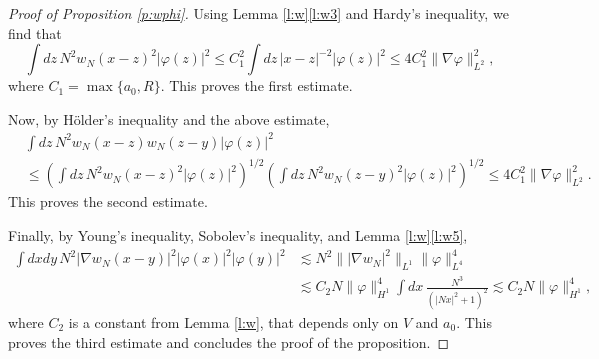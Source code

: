 \documentclass[11pt,a4paper,DIV11]{scrartcl}	%
\newcommand{\bd}{\begin{displaymath}}			%
\newcommand{\ed}{\end{displaymath}}
\begin{document}
\begin{proof}[Proof of Proposition \ref{p:wphi}]
  Using Lemma \ref{l:w}\ref{l:w3} and Hardy's inequality, we find that
  \bd
    \int dz \, N^2 w_N(x-z)^2 |\varphi(z)|^2  \le C_1^2 \int dz \,
    |x-z|^{-2} |\varphi(z)|^2 \leq 4 C_1^2 \| \nabla \varphi \|_{L^2}^2,
  \ed
  where $C_1 = \max\{a_0, R\}$. This proves
  the first estimate.


  Now, by H\"older's inequality and the above estimate,
  \begin{align*}
    & \int dz \, N^2 w_N(x-z) w_N(z-y) |\varphi(z)|^2 \\
    & \le \left( \int dz \, N^2 w_N(x-z)^2 |\varphi(z)|^2 \right)^{1/2} \left(
    \int dz \, N^2 w_N(z-y)^2 |\varphi(z)|^2 \right)^{1/2} \le 4C_1^2 \|
    \nabla \varphi \|_{L^2}^2.
  \end{align*}
  This proves the second estimate.


  Finally, by Young's inequality, Sobolev's inequality, and Lemma
  \ref{l:w}\ref{l:w5},
  \begin{align*}
    \int dx dy \, N^2 |\nabla w_N(x-y)|^2 |\varphi(x)|^2 |\varphi(y)|^2 & \apprle
    N^2 \| | \nabla w_N|^2 \|_{L^1} \| \varphi \|_{L^4}^4 \\
    & \apprle C_2 N \| \varphi \|_{H^1}^4 \int dx \, \frac{N^3}{(|Nx|^2 +
    1)^2} \apprle C_2 N \| \varphi \|_{H^1}^4,
  \end{align*}
  where $C_2$ is a constant from Lemma \ref{l:w}, that depends only on $V$ and
  $a_0$. This proves the third estimate and concludes the proof of the
  proposition.
\end{proof}
\end{document}
